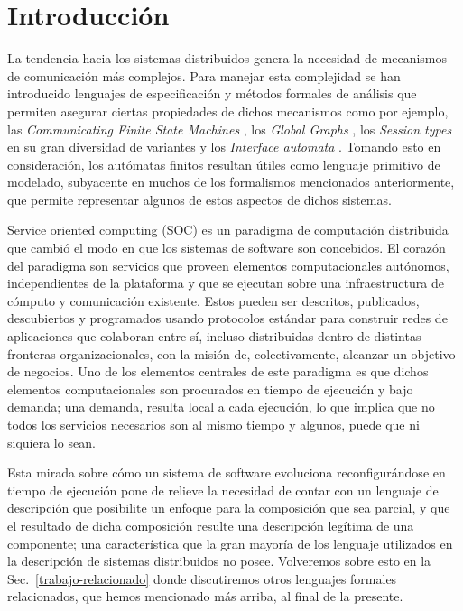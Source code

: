 \chapter{Introducción}
La tendencia hacia los sistemas distribuidos genera la necesidad de mecanismos de comunicación más complejos. Para manejar esta complejidad se han introducido lenguajes de especificación y métodos formales de análisis que permiten asegurar ciertas propiedades de dichos mecanismos como por ejemplo, las \emph{Communicating Finite State Machines} \cite{brand:jacm-30_2}, los \emph{Global Graphs} \cite{castagna:lmcs-8_1}, los \emph{Session types} en su gran diversidad de variantes \cite{honda:esop98,honda:popl08} y los \emph{Interface automata} \cite{dealfaro:esec-fse-01}. Tomando esto en consideración, los autómatas finitos \cite[Def.~2.2.1]{hopcroft01} resultan útiles como lenguaje primitivo de modelado, subyacente en muchos de los formalismos mencionados anteriormente, que permite representar algunos de estos aspectos de dichos sistemas.

Service oriented computing (SOC) es un paradigma de computación distribuida que cambió el modo en que los sistemas de software son concebidos. El corazón del paradigma son servicios que proveen elementos computacionales autónomos, independientes de la plataforma y que se ejecutan sobre una infraestructura de cómputo y comunicación existente. Estos pueden ser descritos, publicados, descubiertos y programados usando protocolos estándar para construir redes de aplicaciones que colaboran entre sí, incluso distribuidas dentro de distintas fronteras organizacionales, con la misión de, colectivamente, alcanzar un objetivo de negocios. Uno de los elementos centrales de este paradigma es que dichos elementos computacionales son procurados en tiempo de ejecución y bajo demanda; una demanda, resulta local a cada ejecución, lo que implica que no todos los servicios necesarios son al mismo tiempo y algunos, puede que ni siquiera lo sean.

Esta mirada sobre cómo un sistema de software evoluciona reconfigurándose en tiempo de ejecución pone de relieve la necesidad de contar con un lenguaje de descripción que posibilite un enfoque para la composición que sea parcial, y que el resultado de dicha composición resulte una descripción legítima de una componente; una característica que la gran mayoría de los lenguaje utilizados en la descripción de sistemas distribuidos no posee. Volveremos sobre esto en la Sec.~\ref{trabajo-relacionado} donde discutiremos otros lenguajes formales relacionados, que hemos mencionado más arriba, al final de la presente.\\

